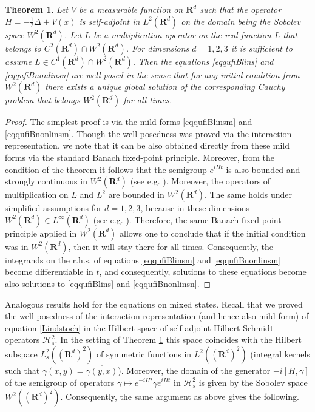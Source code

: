 \documentclass[10pt,a4paper]{amsart}
\def\HC{\mathcal{H}}
\def\R{\mathbf{R}}
\def\ga{\gamma}
\newtheorem{theorem}{Theorem}[section]
\newcommand{\De}{\Delta}
\begin{document}
\begin{theorem}
\label{thclassichamfilt}
Let $V$ be a measurable function on $\R^d$ such that the operator $H=-\frac12 \De +V(x)$ is self-adjoint
in $L^2(\R^d)$ on the domain being the Sobolev space $W^2(\R^d)$. Let $L$ be a multiplication operator
on the real function $L$ that belongs to $C^2(\R^d)\cap W^2(\R^d)$. For dimensions $d=1,2,3$ it
is sufficient to assume $L\in C^1(\R^d)\cap W^2(\R^d)$. Then the equations
\eqref{eqqufiBlins} and \eqref{eqqufiBnonlinsn} are well-posed in the sense that for any initial condition
from $W^2(\R^d)$ there exists a unique global solution of the corresponding Cauchy problem that belongs
$W^2(\R^d)$ for all times.
\end{theorem}

\begin{proof}
The simplest proof is via the mild forms
\eqref{eqqufiBlinsm} and \eqref{eqqufiBnonlinsm}. Though the well-posedness
was proved via the interaction representation, we note that it can be also obtained directly from
these mild forms via the standard Banach fixed-point principle. Moreover,
from the condition of the theorem it follows that the semigroup $e^{iHt}$
is also bounded and strongly continuous in $W^2(\R^d)$ (see e.g. \cite{Yajima}).
Moreover, the operators of multiplication on $L$ and $L^2$ are bounded in $W^2(\R^d)$.
The same holds under simplified assumptions for $d=1,2,3$, because in these dimensions
$W^2(\R^d)\in L^{\infty}(\R^d)$ (see e.g. \cite{ReedSimon}).  Therefore,
the same Banach fixed-point principle applied in $W^2(\R^d)$ allows one
to conclude that if the initial condition was in $W^2(\R^d)$, then it will stay there for all times.
Consequently, the integrands on the r.h.s. of equations \eqref{eqqufiBlinsm} and \eqref{eqqufiBnonlinsm}
become differentiable in $t$, and consequently, solutions to these equations become also solutions to
\eqref{eqqufiBlins} and \eqref{eqqufiBnonlinsn}.
\end{proof}

Analogous results hold for the equations on mixed states. Recall that we proved
the well-posedness of the interaction representation (and hence also mild form)
of equation  \eqref{Lindstoch} in the Hilbert space of self-adjoint
Hilbert Schmidt operators $\HC^2_s$. In the setting of Theorem \ref{thclassichamfilt} this space
coincides with the Hilbert subspace  $L^2_s((\R^d)^2)$ of symmetric functions in
$L^2((\R^d)^2)$ (integral kernels such that $\ga(x,y)=\overline{\ga(y,x)}$).
Moreover, the domain of the generator $-i[H, \ga]$ of the semigroup of operators
$\ga \mapsto e^{-iHt}\ga e^{iH t}$ in $\HC^2_s$  is given by the Sobolev space $W^2((\R^d)^2)$.
Consequently, the same argument as above gives the following.
\end{document}
